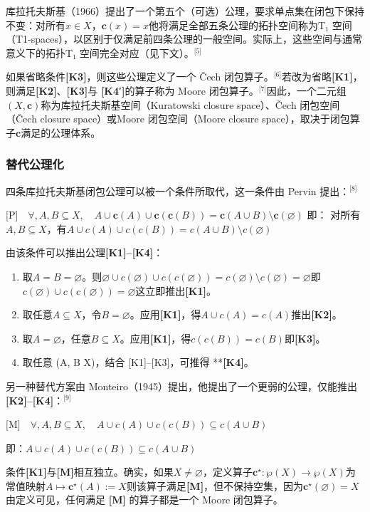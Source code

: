 库拉托夫斯基（1966）提出了一个第五个（可选）公理，要求单点集在闭包下保持不变：对所有$ x \in X $，$\mathbf{c}({x}) = {x}$他将满足全部五条公理的拓扑空间称为T₁ 空间（T1-spaces），以区别于仅满足前四条公理的一般空间。实际上，这些空间与通常意义下的拓扑T₁ 空间完全对应（见下文）。\(^\text{[5]}\)

如果省略条件\textbf{[K3]}，则这些公理定义了一个 Čech 闭包算子。\(^\text{[6]}\)若改为省略\textbf{[K1]}，则满足\textbf{[K2]}、\textbf{[K3]}与 \textbf{[K4′]}的算子称为 Moore 闭包算子。\(^\text{[7]}\)因此，一个二元组$(X, \mathbf{c})$称为库拉托夫斯基空间（Kuratowski closure space）、Čech 闭包空间（Čech closure space）或Moore 闭包空间（Moore closure space），取决于闭包算子$\mathbf{c}$满足的公理体系。
\subsubsection{替代公理化}
四条库拉托夫斯基闭包公理可以被一个条件所取代，这一条件由 Pervin 提出：\(^\text{[8]}\)

$\text{[P]}\quad \forall, A,B \subseteq X, \quad A \cup \mathbf{c}(A) \cup \mathbf{c}(\mathbf{c}(B)) = \mathbf{c}(A \cup B) \setminus \mathbf{c}(\varnothing)$
即：
对所有$A, B \subseteq X$，有$A \cup c(A) \cup c(c(B)) = c(A \cup B) \setminus c(\varnothing)$

由该条件可以推出公理\textbf{[K1]–[K4]}：
\begin{enumerate}
\item 取$A = B = \varnothing$。则$\varnothing \cup c(\varnothing) \cup c(c(\varnothing)) = c(\varnothing) \setminus c(\varnothing) = \varnothing$即$c(\varnothing) \cup c(c(\varnothing)) = \varnothing$这立即推出\textbf{[K1]}。
\item 取任意$A \subseteq X$，令$B = \varnothing$。应用\textbf{[K1]}，得$A \cup c(A) = c(A)$推出\textbf{[K2]}。
\item 取$A = \varnothing$，任意$B \subseteq X$。应用\textbf{[K1]}，得$c(c(B)) = c(B)$即\textbf{[K3]}。
\item 取任意 (A, B \subseteq X)，结合 [K1]–[K3]，可推得 **\textbf{[K4]}。
\end{enumerate}
另一种替代方案由 Monteiro（1945）提出，他提出了一个更弱的公理，仅能推出 \textbf{[K2]–[K4]}：\(^\text{[9]}\)

$\text{[M]}\quad \forall, A,B \subseteq X, \quad A \cup c(A) \cup c(c(B)) \subseteq c(A \cup B)$

即：$A \cup c(A) \cup c(c(B)) \subseteq c(A \cup B)$

条件\textbf{[K1]}与\textbf{[M]}相互独立。确实，如果$X \neq \varnothing$，定义算子$\mathbf{c}^\star : \wp(X) \to \wp(X)$为常值映射$A \mapsto \mathbf{c}^\star(A) := X$则该算子满足\textbf{[M]}，但不保持空集，因为$\mathbf{c}^\star(\varnothing) = X$由定义可见，任何满足 \textbf{[M]} 的算子都是一个 Moore 闭包算子。

